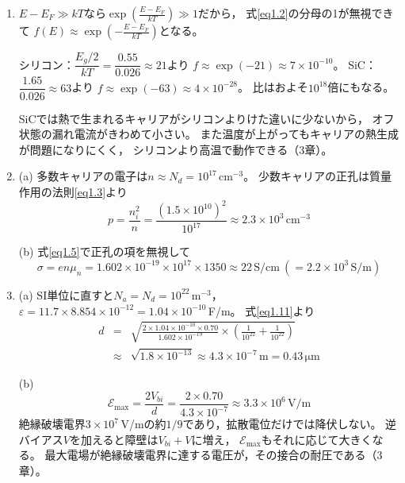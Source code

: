 \answer
\begin{enumerate}

\item[\ref{ex1.1}]
$E - E_F \gg kT$なら$\exp\left(\frac{E-E_F}{kT}\right) \gg 1$だから，
式\ref{eq1.2}の分母の1が無視できて
$f(E) \approx \exp\left(-\frac{E-E_F}{kT}\right)$となる。

シリコン：$\dfrac{E_g/2}{kT} = \dfrac{0.55}{0.026} \approx 21$より
$f \approx \exp(-21) \approx 7\times10^{-10}$。
SiC：$\dfrac{1.65}{0.026} \approx 63$より
$f \approx \exp(-63) \approx 4\times10^{-28}$。
比はおよそ$10^{18}$倍にもなる。

SiCでは熱で生まれるキャリアがシリコンよりけた違いに少ないから，
オフ状態の漏れ電流がきわめて小さい。
また温度が上がってもキャリアの熱生成が問題になりにくく，
シリコンより高温で動作できる（3章）。

\item[\ref{ex1.2}]
(a) 多数キャリアの電子は$n \approx N_d = 10^{17}\,\mathrm{cm^{-3}}$。
少数キャリアの正孔は質量作用の法則\ref{eq1.3}より
\begin{equation*}
p = \frac{n_i^2}{n} = \frac{(1.5\times10^{10})^2}{10^{17}}
\approx 2.3\times10^{3}\,\mathrm{cm^{-3}}
\end{equation*}

(b) 式\ref{eq1.5}で正孔の項を無視して
\begin{equation*}
\sigma = e n \mu_n = 1.602\times10^{-19}\times10^{17}\times1350
\approx 22\,\mathrm{S/cm}\ (= 2.2\times10^{3}\,\mathrm{S/m})
\end{equation*}

\item[\ref{ex1.3}]
(a) SI単位に直すと$N_a = N_d = 10^{22}\,\mathrm{m^{-3}}$，
$\varepsilon = 11.7\times8.854\times10^{-12} = 1.04\times10^{-10}$\,F/m。
式\ref{eq1.11}より
\begin{eqnarray}
d &=& \sqrt{\frac{2\times1.04\times10^{-10}\times0.70}{1.602\times10^{-19}}
\times\left(\frac{1}{10^{22}}+\frac{1}{10^{22}}\right)} \nonumber\\
&\approx& \sqrt{1.8\times10^{-13}} \approx 4.3\times10^{-7}\,\mathrm{m}
= 0.43\,\mathrm{\mu m} \nonumber
\end{eqnarray}

(b)
\begin{equation*}
\mathcal{E}_{\max} = \frac{2V_{bi}}{d} = \frac{2\times0.70}{4.3\times10^{-7}}
\approx 3.3\times10^{6}\,\mathrm{V/m}
\end{equation*}
絶縁破壊電界$3\times10^7$\,V/mの約$1/9$であり，拡散電位だけでは降伏しない。
逆バイアス$V$を加えると障壁は$V_{bi}+V$に増え，
$\mathcal{E}_{\max}$もそれに応じて大きくなる。
最大電場が絶縁破壊電界に達する電圧が，その接合の耐圧である（3章）。


\end{enumerate}

